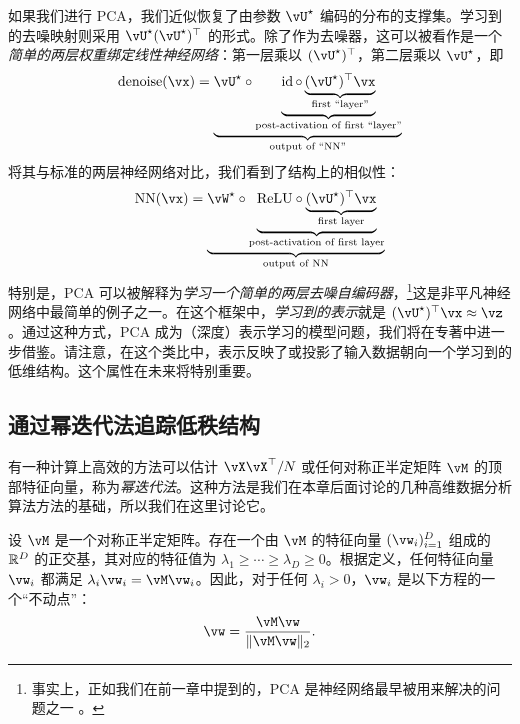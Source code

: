 \documentclass[../../book-main.tex]{subfiles}
\begin{document}
\begin{remark}[神经网络解释]
    如果我们进行 PCA，我们近似恢复了由参数 \(\vU^{\star}\) 编码的分布的支撑集。学习到的去噪映射则采用 \(\vU^{\star}(\vU^{\star})^{\top}\) 的形式。除了作为去噪器，这可以被看作是一个\textit{简单的两层权重绑定线性神经网络}：第一层乘以 \((\vU^{\star})^{\top}\)，第二层乘以 \(\vU^{\star}\)，即
    \begin{equation}
        \operatorname{denoise}(\vx) = \underbrace{\vU^{\star} \circ
        \underbrace{\id \circ \underbrace{(\vU^{\star})^{\top}\vx}_{\text{first ``layer''}}}_{\text{post-activation of first ``layer''}}}_{\text{output of ``NN''}}
    \end{equation}
    将其与标准的两层神经网络对比，我们看到了结构上的相似性：
    \begin{equation}
        \operatorname{NN}(\vx) = \underbrace{\vW^{\star} \circ
        \underbrace{\mathrm{ReLU} \circ \underbrace{(\vU^{\star})^{\top}\vx}_{\text{first layer}}}_{\text{post-activation of first layer}}}_{\text{output of NN}}
    \end{equation}
    特别是，PCA 可以被解释为\textit{学习一个简单的两层去噪自编码器}，\footnote{事实上，正如我们在前一章中提到的，PCA 是神经网络最早被用来解决的问题之一 \cite{Oja1982SimplifiedNM,Baldi89}。}这是非平凡神经网络中最简单的例子之一。在这个框架中，\textit{学习到的表示}就是 \((\vU^{\star})^{\top}\vx \approx \vz\)。通过这种方式，PCA 成为（深度）表示学习的模型问题，我们将在专著中进一步借鉴。请注意，在这个类比中，表示反映了或投影了输入数据朝向一个学习到的低维结构。这个属性在未来将特别重要。
\end{remark}

\subsection{通过幂迭代法追踪低秩结构}\label{subsec:power iterations}

有一种计算上高效的方法可以估计 \(\vX\vX^{\top}/N\) 或任何对称正半定矩阵 \(\vM\) 的顶部特征向量，称为\textit{幂迭代法}。这种方法是我们在本章后面讨论的几种高维数据分析算法方法的基础，所以我们在这里讨论它。

设 \(\vM\) 是一个对称正半定矩阵。存在一个由 \(\vM\) 的特征向量 \((\vw_{i})_{i = 1}^{D}\) 组成的 \(\mathbb{R}^{D}\) 的正交基，其对应的特征值为 \(\lambda_{1} \geq \cdots \geq \lambda_{D} \geq 0\)。根据定义，任何特征向量 $\vw_i$ 都满足 $\lambda_i \vw_i = \vM \vw_i$。因此，对于任何 $\lambda_i > 0$，$\vw_i$ 是以下方程的一个“不动点”：
\begin{equation}
    \vw = \frac{\vM\vw}{\norm{\vM\vw}_{2}}.
    \label{eqn:PCA-fixed-point}
\end{equation}
\end{document}
